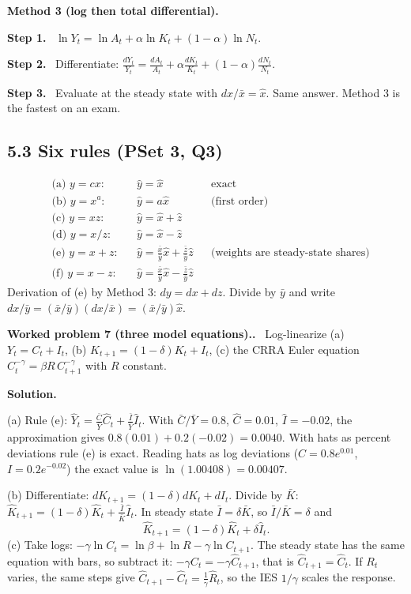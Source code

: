 \documentclass[12pt]{article}
\newcommand{\st}[1]{\par\smallskip\textbf{Step #1.}\ }
\newcommand{\ans}[1]{\[\boxed{\ #1\ }\]}
\newcommand{\prob}[1]{\par\bigskip\textbf{Worked problem #1.}\ }
\newcommand{\sol}{\par\smallskip\textbf{Solution.}\par}
\begin{document}
\textbf{Method 3 (log then total differential).}
\st{1} $\ln Y_t=\ln A_t+\alpha\ln K_t+(1-\alpha)\ln N_t$.
\st{2} Differentiate: $\frac{dY_t}{Y_t}=\frac{dA_t}{A_t}+\alpha\frac{dK_t}{K_t}+(1-\alpha)\frac{dN_t}{N_t}$.
\st{3} Evaluate at the steady state with $dx/\bar x=\hat x$. Same answer.
Method 3 is the fastest on an exam.

\subsection*{5.3 Six rules (PSet 3, Q3)}
\begin{align*}
&\text{(a) } y=cx: && \hat y=\hat x &&\text{exact}\\
&\text{(b) } y=x^a: && \hat y=a\hat x &&\text{(first order)}\\
&\text{(c) } y=xz: && \hat y=\hat x+\hat z\\
&\text{(d) } y=x/z: && \hat y=\hat x-\hat z\\
&\text{(e) } y=x+z: && \hat y=\tfrac{\bar x}{\bar y}\hat x+\tfrac{\bar z}{\bar y}\hat z &&\text{(weights are steady-state shares)}\\
&\text{(f) } y=x-z: && \hat y=\tfrac{\bar x}{\bar y}\hat x-\tfrac{\bar z}{\bar y}\hat z
\end{align*}
Derivation of (e) by Method 3: $dy=dx+dz$. Divide by $\bar y$ and write
$dx/\bar y=(\bar x/\bar y)(dx/\bar x)=(\bar x/\bar y)\hat x$.

\prob{7 (three model equations).} Log-linearize (a) $Y_t=C_t+I_t$,
(b) $K_{t+1}=(1-\delta)K_t+I_t$, (c) the CRRA Euler equation $C_t^{-\gamma}=\beta R\,C_{t+1}^{-\gamma}$ with $R$ constant.
\sol
(a) Rule (e): $\hat Y_t=\frac{\bar C}{\bar Y}\hat C_t+\frac{\bar I}{\bar Y}\hat I_t$.
With $\bar C/\bar Y=0.8$, $\hat C=0.01$, $\hat I=-0.02$, the approximation gives $0.8(0.01)+0.2(-0.02)=0.0040$. With hats as percent
deviations rule (e) is exact. Reading hats as log deviations
($C=0.8e^{0.01}$, $I=0.2e^{-0.02}$) the exact value is $\ln(1.00408)=0.00407$.

(b) Differentiate: $dK_{t+1}=(1-\delta)dK_t+dI_t$. Divide by $\bar K$:
$\hat K_{t+1}=(1-\delta)\hat K_t+\frac{\bar I}{\bar K}\hat I_t$. In steady state $\bar I=\delta\bar K$, so $\bar I/\bar K=\delta$ and
\ans{\hat K_{t+1}=(1-\delta)\hat K_t+\delta\hat I_t .}
(c) Take logs: $-\gamma\ln C_t=\ln\beta+\ln R-\gamma\ln C_{t+1}$. The steady
state has the same equation with bars, so subtract it:
$-\gamma\hat C_t=-\gamma\hat C_{t+1}$, that is $\hat C_{t+1}=\hat C_t$.
If $R_t$ varies, the same steps give $\hat C_{t+1}-\hat C_t=\frac1\gamma\hat R_t$, so the IES $1/\gamma$ scales the response.
\end{document}
